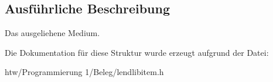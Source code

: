 \subsection{Ausführliche Beschreibung}
Das ausgeliehene Medium. 

Die Dokumentation für diese Struktur wurde erzeugt aufgrund der Datei\+:\begin{DoxyCompactItemize}
\item 
htw/\+Programmierung 1/\+Beleg/lendlibitem.\+h\end{DoxyCompactItemize}
